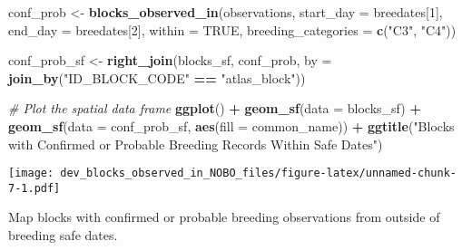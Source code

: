 \documentclass[
]{article}
\newenvironment{Shaded}{\begin{snugshade}}{\end{snugshade}}
\newcommand{\AttributeTok}[1]{\textcolor[rgb]{0.13,0.29,0.53}{#1}}
\newcommand{\CommentTok}[1]{\textcolor[rgb]{0.56,0.35,0.01}{\textit{#1}}}
\newcommand{\ConstantTok}[1]{\textcolor[rgb]{0.56,0.35,0.01}{#1}}
\newcommand{\DecValTok}[1]{\textcolor[rgb]{0.00,0.00,0.81}{#1}}
\newcommand{\FunctionTok}[1]{\textcolor[rgb]{0.13,0.29,0.53}{\textbf{#1}}}
\newcommand{\NormalTok}[1]{#1}
\newcommand{\OtherTok}[1]{\textcolor[rgb]{0.56,0.35,0.01}{#1}}
\newcommand{\SpecialCharTok}[1]{\textcolor[rgb]{0.81,0.36,0.00}{\textbf{#1}}}
\newcommand{\StringTok}[1]{\textcolor[rgb]{0.31,0.60,0.02}{#1}}
\begin{document}
\begin{Shaded}
\begin{Highlighting}[]
\NormalTok{conf\_prob }\OtherTok{\textless{}{-}} \FunctionTok{blocks\_observed\_in}\NormalTok{(observations, }\AttributeTok{start\_day =}\NormalTok{ breedates[}\DecValTok{1}\NormalTok{], }
                                \AttributeTok{end\_day =}\NormalTok{ breedates[}\DecValTok{2}\NormalTok{], }
                                \AttributeTok{within =} \ConstantTok{TRUE}\NormalTok{,}
                                \AttributeTok{breeding\_categories =} \FunctionTok{c}\NormalTok{(}\StringTok{"C3"}\NormalTok{, }\StringTok{"C4"}\NormalTok{))}

\NormalTok{conf\_prob\_sf }\OtherTok{\textless{}{-}} \FunctionTok{right\_join}\NormalTok{(blocks\_sf, conf\_prob, }
                           \AttributeTok{by =} \FunctionTok{join\_by}\NormalTok{(}\StringTok{"ID\_BLOCK\_CODE"} \SpecialCharTok{==} \StringTok{"atlas\_block"}\NormalTok{))}

\CommentTok{\# Plot the spatial data frame}
\FunctionTok{ggplot}\NormalTok{() }\SpecialCharTok{+}
  \FunctionTok{geom\_sf}\NormalTok{(}\AttributeTok{data =}\NormalTok{ blocks\_sf) }\SpecialCharTok{+}
  \FunctionTok{geom\_sf}\NormalTok{(}\AttributeTok{data =}\NormalTok{ conf\_prob\_sf, }\FunctionTok{aes}\NormalTok{(}\AttributeTok{fill =}\NormalTok{ common\_name)) }\SpecialCharTok{+}
  \FunctionTok{ggtitle}\NormalTok{(}\StringTok{"Blocks with Confirmed or Probable Breeding Records Within Safe Dates"}\NormalTok{)}
\end{Highlighting}
\end{Shaded}

\texttt{[image: dev\_blocks\_observed\_in\_NOBO\_files/figure-latex/unnamed-chunk-7-1.pdf]}

Map blocks with confirmed or probable breeding observations from outside
of breeding safe dates.
\end{document}
